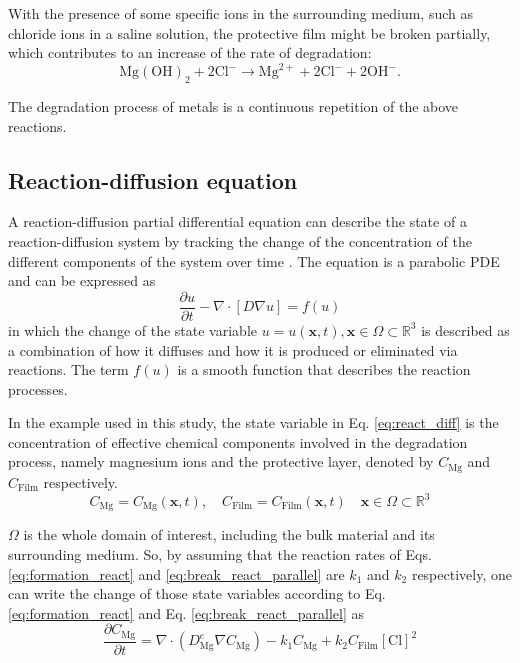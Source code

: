 With the presence of some specific ions in the surrounding medium, such as chloride ions in a saline solution, the protective film might be broken partially, which contributes to an increase of the rate of degradation:
\begin{equation} \label{eq:break_react_parallel}
\mathrm{Mg}(\mathrm{OH})_{2}+2\mathrm{Cl}^{-} \longrightarrow \mathrm{Mg}^{2+} + 2\mathrm{Cl}^{-} + 2\mathrm{OH}^{-}.
\end{equation}

The degradation process of metals is a continuous repetition of the above reactions.


\subsection{Reaction-diffusion equation}

A reaction-diffusion partial differential equation can describe the state of a reaction-diffusion system by tracking the change of the concentration of the different components of the system over time \cite{Grindrod1996}. The equation is a parabolic \gls{PDE} and can be expressed as
\begin{equation} \label{eq:react_diff}
\frac{\partial u}{\partial t}-\nabla \cdot [D \nabla u]=f(u)
\end{equation}
\noindent in which the change of the state variable $u=u(\mathbf{x},t), \mathbf{x} \in \Omega \subset \mathbb{R}^{3}$ is described as a combination of how it diffuses and how it is produced or eliminated via reactions. The term $f(u)$ is a smooth function that describes the reaction processes.

In the example used in this study, the state variable in Eq. \ref{eq:react_diff} is the concentration of effective chemical components involved in the degradation process, namely magnesium ions and the protective layer, denoted by $C_{\mathrm{Mg}}$ and $C_{\mathrm{Film}}$ respectively.
\begin{equation}
C_{\mathrm{Mg}} = C_{\mathrm{Mg}}(\mathbf{x},t), \quad C_{\mathrm{Film}} = C_{\mathrm{Film}}(\mathbf{x},t) \quad \mathbf{x} \in \Omega \subset \mathbb{R}^{3}
\end{equation}

\noindent  $\Omega$ is the whole domain of interest, including the bulk material and its surrounding medium. So, by assuming that the reaction rates of Eqs. \ref{eq:formation_react} and \ref{eq:break_react_parallel} are $k_1$ and $k_2$ respectively,  one can write the change of those state variables according to Eq. \ref{eq:formation_react} and Eq. \ref{eq:break_react_parallel} as
\begin{equation} \label{eq:pde_mg_primary}
\frac{\partial C_{\mathrm{Mg}}}{\partial t}=\nabla \cdot \left(D_{\mathrm{Mg}}^{e}   \nabla C_{\mathrm{Mg}} \right)-k_{1} C_{\mathrm{Mg}} +k_{2} C_{\mathrm{Film}} [\mathrm{Cl}]^{2}
\end{equation}

